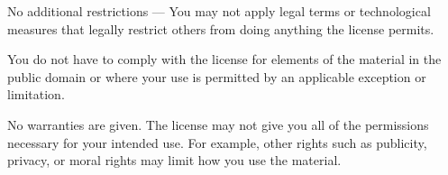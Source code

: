 {  \ifninebythirteen

    \vspace{0.15cm}

  \else

    \vspace{0.2cm}

  \fi

  No additional restrictions — You may not apply legal terms or technological measures that legally restrict others from doing anything the license permits.

  You do not have to comply with the license for elements of the material in the public domain or where your use is permitted by an applicable exception or limitation.

  \ifninebythirteen\clearpage\fi

  No warranties are given. The license may not give you all of the permissions necessary for your intended use. For example, other rights such as publicity, privacy, or moral rights may limit how you use the material.

}

\ifninebythirteen

\else

  \clearpage

\fi

